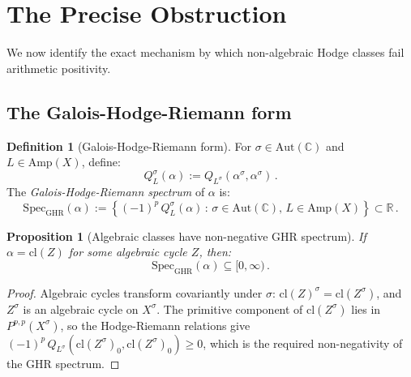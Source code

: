 \documentclass[aps,prd,twocolumn,superscriptaddress,nofootinbib]{revtex4-2}
\newtheorem{proposition}[theorem]{Proposition}
\theoremstyle{definition}
\newtheorem{definition}[theorem]{Definition}
\theoremstyle{remark}
\begin{document}
\section{The Precise Obstruction}
\label{sec:obstruction}

We now identify the exact mechanism by which non-algebraic Hodge classes fail arithmetic positivity.

\subsection{The Galois-Hodge-Riemann form}

\begin{definition}[Galois-Hodge-Riemann form]
\label{def:galois_HR}
For $\sigma \in \mathrm{Aut}(\mathbb{C})$ and $L \in \mathrm{Amp}(X)$, define:
\begin{equation}
Q_L^\sigma(\alpha) := Q_{L^\sigma}(\alpha^\sigma, \alpha^\sigma)\,.
\label{eq:galois_HR}
\end{equation}
The \textit{Galois-Hodge-Riemann spectrum} of $\alpha$ is:
\begin{equation}
\mathrm{Spec}_{\mathrm{GHR}}(\alpha) := \left\{ (-1)^p\, Q_L^\sigma(\alpha) \,:\, \sigma \in \mathrm{Aut}(\mathbb{C}),\, L \in \mathrm{Amp}(X) \right\} \subset \mathbb{R}\,.
\end{equation}
\end{definition}

\begin{proposition}[Algebraic classes have non-negative GHR spectrum]
\label{prop:ghr_positive}
If $\alpha = \mathrm{cl}(Z)$ for some algebraic cycle $Z$, then:
\begin{equation}
\mathrm{Spec}_{\mathrm{GHR}}(\alpha) \subseteq [0, \infty)\,.
\end{equation}
\end{proposition}

\begin{proof}
Algebraic cycles transform covariantly under $\sigma$: $\mathrm{cl}(Z)^\sigma = \mathrm{cl}(Z^\sigma)$, and $Z^\sigma$ is an algebraic cycle on $X^\sigma$. The primitive component of $\mathrm{cl}(Z^\sigma)$ lies in $P^{p,p}(X^\sigma)$, so the Hodge-Riemann relations give $(-1)^p\, Q_{L^\sigma}(\mathrm{cl}(Z^\sigma)_0, \mathrm{cl}(Z^\sigma)_0) \geq 0$, which is the required non-negativity of the GHR spectrum.
\end{proof}
\end{document}

